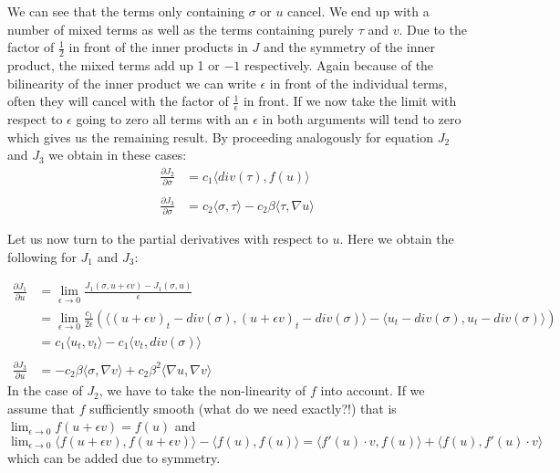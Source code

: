 \documentclass[fleqn, a4paper, 11pt, bibliography=totoc]{report}
\begin{document}
We can see that the terms only containing $\sigma$ or $u$ cancel. We end up with a number of mixed terms as well as the terms containing purely $\tau$ and $v$. Due to the factor of $\frac{1}{2}$ in front of the inner products in $J$ and the symmetry of the inner product, the mixed terms add up 1 or $-1$ respectively. Again because of the bilinearity of the inner product we can write $\epsilon$ in front of the individual terms, often they will cancel with the factor of $\frac{1}{\epsilon}$ in front. If we now take the limit with respect to $\epsilon$ going to zero all terms with an $\epsilon$ in both arguments will tend to zero which gives us the remaining result. By proceeding analogously for equation $J_2$ and $J_3$ we obtain in these cases: 
\begin{equation}
\begin{aligned}
\frac{\partial J_2}{\partial \sigma} &= c_1 \langle div(\tau), f(u) \rangle \\
\\
\frac{\partial J_3}{\partial \sigma} &= c_2 \langle \sigma, \tau \rangle - c_2 \beta \langle \tau, \nabla u \rangle
\end{aligned}
\end{equation}

Let us now turn to the partial derivatives with respect to $u$. Here we obtain the following for $J_1$ and $J_3$:

\begin{equation}
\begin{aligned}
\frac{\partial J_1}{\partial u} &=   \lim_{\epsilon \rightarrow 0} \frac{J_1(\sigma, u + \epsilon v) - J_1(\sigma, u)}{\epsilon}  \\
&= \lim_{\epsilon \rightarrow 0} \frac{c_1}{2 \epsilon} (\langle (u + \epsilon v)_t - div(\sigma), (u + \epsilon v)_t - div(\sigma) \rangle - \langle u_t - div(\sigma), u_t - div(\sigma) \rangle) \\
&= c_1 \langle u_t, v_t \rangle - c_1 \langle v_t, div(\sigma) \rangle \\
\\
\frac{\partial J_3}{\partial u} &= - c_2 \beta \langle \sigma, \nabla v \rangle + c_2 \beta^2 \langle \nabla u, \nabla v \rangle
\end{aligned}
\end{equation}
In the case of $J_2$, we have to take the non-linearity of $f$ into account. If we assume that $f$ sufficiently smooth (what do we need exactly?!) that is $  \lim_{\epsilon \rightarrow 0} f(u + \epsilon v) = f(u) $ and $  \lim_{\epsilon \rightarrow 0} \langle f(u+ \epsilon v), f(u + \epsilon v) \rangle - \langle f(u), f(u) \rangle = \langle f'(u) \cdot v, f(u) \rangle + \langle f(u), f'(u) \cdot v \rangle$ which can be added due to symmetry.
\end{document}
